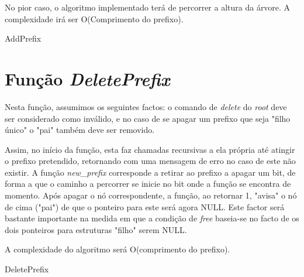 \documentclass[a4paper]{article}
\begin{document}
No pior caso, o algoritmo implementado terá de percorrer a altura da árvore. A complexidade irá ser O(Comprimento do prefixo).

\begin{algorithm}[H]
 \caption{AddPrefix}
\end{algorithm}

\section{Função \textit{DeletePrefix}}
Nesta função, assumimos os seguintes factos: o comando de \textit{delete} do \textit{root} deve ser considerado como inválido, e no caso de se apagar um prefixo que seja "filho único" o "pai" também deve ser removido.

Assim, no início da função, esta faz chamadas recursivas a ela própria até atingir o prefixo pretendido, retornando com uma mensagem de erro no caso de este não existir.
 A função \textit{new\_prefix} corresponde a retirar ao prefixo a apagar um bit, de forma a que o caminho a percorrer se inicie no bit onde a função se encontra de momento.%
  Após apagar o nó correspondente, a função, ao retornar 1, "avisa" o nó de cima ("pai") de que o ponteiro para este será agora NULL. Este factor será bastante importante na medida em que a condição de \textit{free} baseia-se no facto de os dois ponteiros para estruturas "filho" serem NULL.

A complexidade do algoritmo será O(comprimento do prefixo). %

\begin{algorithm}[H]
 \;
 \caption{DeletePrefix}
\end{algorithm}
\end{document}
